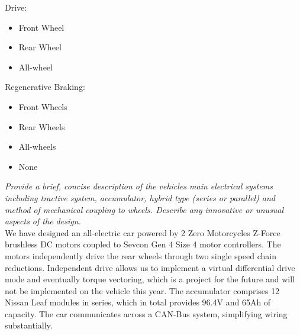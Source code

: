\documentclass{article}
\begin{document}
    \par{Drive:}
    \begin{itemize}
        \item \makebox[0pt][l]{$\square$}\raisebox{.15ex}{\hspace{0.1em}} \hspace{0.2cm} Front Wheel
        \item \makebox[0pt][l]{$\square$}\raisebox{.15ex}{\hspace{0.1em}$\checkmark$} \hspace{0.2cm} Rear Wheel
        \item \makebox[0pt][l]{$\square$}\raisebox{.15ex}{\hspace{0.1em}} \hspace{0.2cm} All-wheel
    \end{itemize}

    \par{Regenerative Braking:}
    \begin{itemize}
        \item \makebox[0pt][l]{$\square$}\raisebox{.15ex}{\hspace{0.1em}} \hspace{0.2cm} Front Wheels
        \item \makebox[0pt][l]{$\square$}\raisebox{.15ex}{\hspace{0.1em}$\checkmark$} \hspace{0.2cm} Rear Wheels
        \item \makebox[0pt][l]{$\square$}\raisebox{.15ex}{\hspace{0.1em}} \hspace{0.2cm} All-wheels
        \item \makebox[0pt][l]{$\square$}\raisebox{.15ex}{\hspace{0.1em}} \hspace{0.2cm} None
    \end{itemize}

\newpage

        \textit{Provide a brief, concise description of the vehicles main electrical systems including tractive system, accumulator, hybrid type (series or parallel) and method of mechanical coupling to wheels. Describe any innovative or unusual aspects of the design.}\\

        We have designed an all-electric car powered by 2 Zero Motorcycles Z-Force brushless DC motors coupled to Sevcon Gen 4 Size 4 motor controllers. The motors independently drive the rear wheels through two single speed chain reductions. Independent drive allows us to implement a virtual differential drive mode and eventually torque vectoring, which is a project for the future and will not be implemented on the vehicle this year. The accumulator comprises 12 Nissan Leaf modules in series, which in total provides 96.4V and 65Ah of capacity. The car communicates across a CAN-Bus system, simplifying wiring substantially.\\
\end{document}
